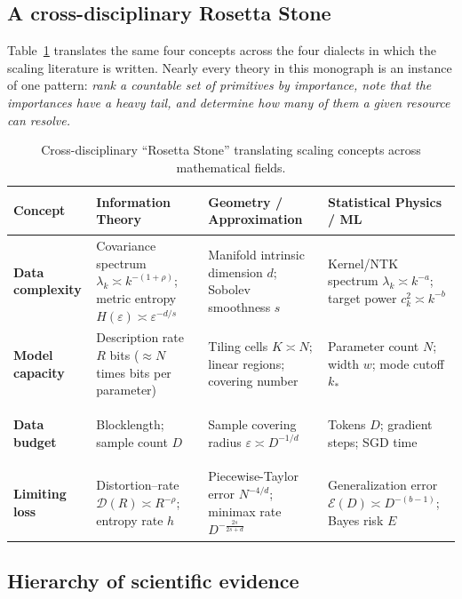 \documentclass[11pt,a4paper]{article}
\theoremstyle{definition}
\begin{document}
\subsection{A cross-disciplinary Rosetta Stone}

Table~\ref{tab:rosetta_stone} translates the same four concepts across the four dialects in which the scaling literature is written. Nearly every theory in this monograph is an instance of one pattern: \emph{rank a countable set of primitives by importance, note that the importances have a heavy tail, and determine how many of them a given resource can resolve.}

\begin{table}[htbp]
\centering
\small
\renewcommand{\arraystretch}{1.3}
\begin{tabularx}{\textwidth}{>{\bfseries\raggedright\arraybackslash}p{2.6cm} >{\raggedright\arraybackslash}X >{\raggedright\arraybackslash}X >{\raggedright\arraybackslash}X}
\toprule
\textbf{Concept} & \textbf{Information Theory} & \textbf{Geometry / Approximation} & \textbf{Statistical Physics / ML} \\
\midrule
\textbf{Data complexity} & Covariance spectrum $\lambda_k \asymp k^{-(1+\rho)}$; metric entropy $H(\varepsilon) \asymp \varepsilon^{-d/s}$ & Manifold intrinsic dimension $d$; Sobolev smoothness $s$ & Kernel/NTK spectrum $\lambda_k \asymp k^{-a}$; target power $c_k^2 \asymp k^{-b}$ \\
\midrule
\textbf{Model capacity} & Description rate $R$ bits ($\approx N$ times bits per parameter) & Tiling cells $K \asymp N$; linear regions; covering number & Parameter count $N$; width $w$; mode cutoff $k_*$ \\
\midrule
\textbf{Data budget} & Blocklength; sample count $D$ & Sample covering radius $\varepsilon \asymp D^{-1/d}$ & Tokens $D$; gradient steps; SGD time \\
\midrule
\textbf{Limiting loss} & Distortion--rate $\mathcal{D}(R) \asymp R^{-\rho}$; entropy rate $h$ & Piecewise-Taylor error $N^{-4/d}$; minimax rate $D^{-\frac{2s}{2s+d}}$ & Generalization error $\mathcal{E}(D) \asymp D^{-(b-1)}$; Bayes risk $E$ \\
\bottomrule
\end{tabularx}
\caption{Cross-disciplinary ``Rosetta Stone'' translating scaling concepts across mathematical fields.}
\label{tab:rosetta_stone}
\end{table}

\subsection{Hierarchy of scientific evidence}
\label{subsec:evidence}
\end{document}
